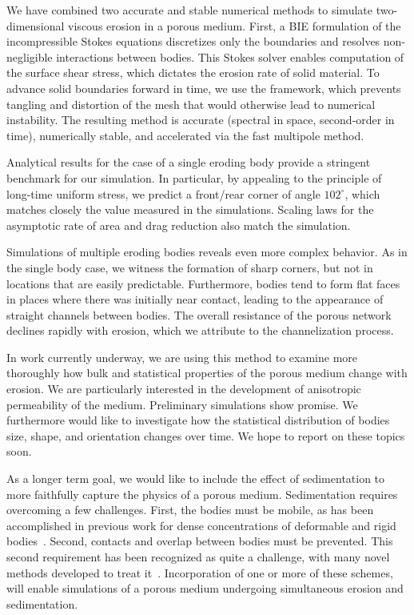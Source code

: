 \documentclass[preprint, 10pt]{elsarticle}
\begin{document}
We have combined two accurate and stable numerical methods to simulate two-dimensional viscous erosion in a porous medium. First, a BIE formulation of the incompressible Stokes equations discretizes only the boundaries and resolves non-negligible interactions between bodies. This Stokes solver enables computation of the surface shear stress, which dictates the erosion rate of solid material. To advance solid boundaries forward in time, we use the {\thL} framework, which prevents tangling and distortion of the mesh that would otherwise lead to numerical instability. The resulting method is accurate (spectral in space, second-order in time), numerically stable, and accelerated via the fast multipole method.

Analytical results for the case of a single eroding body provide a stringent benchmark for our simulation. In particular, by appealing to the principle of long-time uniform stress, we predict a front/rear corner of angle $102^{\circ}$, which matches closely the value measured in the simulations. Scaling laws for the asymptotic rate of area and drag reduction also match the simulation.

Simulations of multiple eroding bodies reveals even more complex behavior. As in the single body case, we witness the formation of sharp corners, but not in locations that are easily predictable. Furthermore, bodies tend to form flat faces in places where there was initially near contact, leading to the appearance of straight channels between bodies. The overall resistance of the porous network declines rapidly with erosion, which we attribute to the channelization process.

In work currently underway, we are using this method to examine more thoroughly how bulk and statistical properties of the porous medium change with erosion. We are particularly interested in the development of anisotropic permeability of the medium. Preliminary simulations show promise. We furthermore would like to investigate how the statistical distribution of bodies size, shape, and orientation changes over time. We hope to report on these topics soon.

As a longer term goal, we would like to include the effect of sedimentation to more faithfully capture the physics of a porous medium.  Sedimentation requires overcoming a few challenges. First, the bodies must be mobile, as has been accomplished in previous work for dense concentrations of deformable and rigid bodies~\cite{qua-bir2014a, cor-gre-rac-vee2017, cor-vee2017, kli-tor2016b, rac-gre2016, qua-bir2016}. Second, contacts and overlap between bodies must be prevented. This second requirement has been recognized as quite a challenge, with many novel methods developed to treat it~\cite{lu-rah-zor2017, kab-qua-bir2018, san-mo1994}. Incorporation of one or more of these schemes, will enable simulations of a porous medium undergoing simultaneous erosion and sedimentation.
\end{document}
